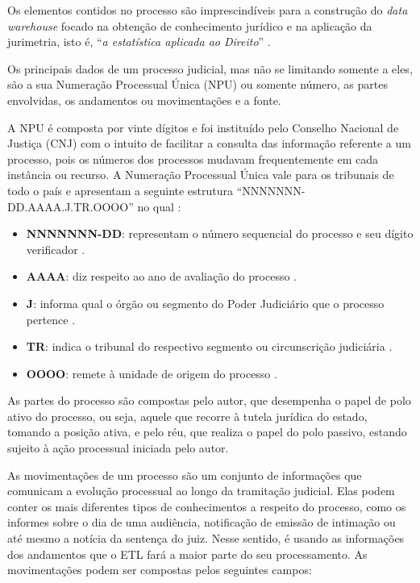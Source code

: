 Os elementos contidos no processo são imprescindíveis para a construção do \textit{data warehouse} focado na obtenção de conhecimento jurídico e na aplicação da jurimetria, isto é, \enquote{\textit{a estatística aplicada ao Direito}} \cite{newlawJurimetria}.

Os principais dados de um processo judicial, mas não se limitando somente a eles, são a sua Numeração Processual Única (NPU) ou somente número, as partes envolvidas, os andamentos ou movimentações e a fonte.

A NPU é composta por vinte dígitos e foi instituído pelo Conselho Nacional de Justiça (CNJ) com o intuito de facilitar a consulta das informação referente a um processo, pois os números dos processos mudavam frequentemente em cada instância ou recurso. A Numeração Processual Única vale para os tribunais de todo o país e apresentam a seguinte estrutura \enquote{NNNNNNN-DD.AAAA.J.TR.OOOO} no qual \cite{jusbrasilNPU}:

\begin{itemize}
    \item \textbf{NNNNNNN-DD}: representam o número sequencial do processo e seu dígito verificador \cite{TRF4NPU}.
    \item \textbf{AAAA}: diz respeito ao ano de avaliação do processo \cite{TRF4NPU}.
    \item \textbf{J}: informa qual o órgão ou segmento do Poder Judiciário que o processo pertence \cite{TRF4NPU}.
    \item \textbf{TR}: indica o tribunal do respectivo segmento ou circunscrição judiciária \cite{TRF4NPU}.
    \item \textbf{OOOO}: remete à unidade de origem do processo \cite{TRF4NPU}.
\end{itemize}

As partes do processo são compostas pelo autor, que desempenha o papel de polo ativo do processo, ou seja, aquele que recorre à tutela jurídica do estado, tomando a posição ativa, e pelo réu, que realiza o papel do polo passivo, estando sujeito à ação processual iniciada pelo autor.

As movimentações de um processo são um conjunto de informações que comunicam a evolução processual ao longo da tramitação judicial. Elas podem conter os mais diferentes tipos de conhecimentos a respeito do processo, como os informes sobre o dia de uma audiência, notificação de emissão de intimação ou até mesmo a notícia da sentença do juiz. Nesse sentido, é usando as informações dos andamentos que o ETL fará a maior parte do seu processamento. As movimentações podem ser compostas pelos seguintes campos: 

